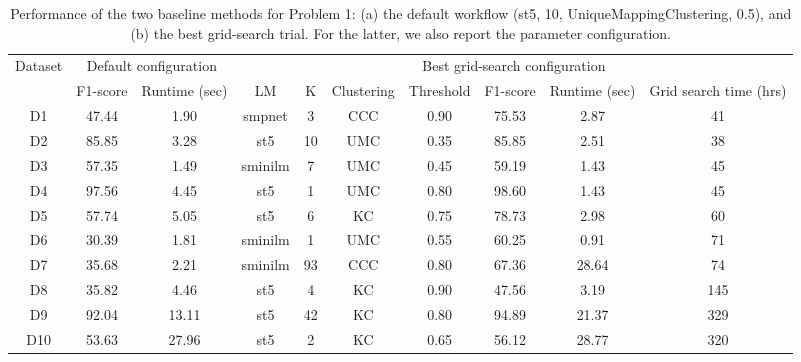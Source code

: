 \begin{table*}[t]
\begin{center}  
\small 
\caption{Performance of the two baseline methods for Problem 1: (a) the default workflow (st5, 10, UniqueMappingClustering, 0.5), and (b) the best grid-search trial. For the latter, we also report the parameter configuration.}
\label{tab:best-gridesearch-trials}
\begin{tabular}{|c||c|c||c|c|c|c||c|c|c|}
\hline
\multirow{2}{*}{Dataset} & \multicolumn{2}{c||}{Default configuration} & \multicolumn{7}{c|}{Best grid-search configuration} \\
& F1-score & Runtime (sec) & LM & K & Clustering & Threshold & F1-score & Runtime (sec) & Grid search time (hrs) \\
\hline
\hline
D1 & 47.44 & 1.90 & smpnet & 3 & CCC & 0.90 & 75.53 & 2.87 & 41 \\
D2 & 85.85 & 3.28 & st5 & 10 & UMC & 0.35 & 85.85 & 2.51 & 38 \\
D3 & 57.35 & 1.49 & sminilm & 7 & UMC & 0.45 & 59.19 & 1.43 & 45 \\
D4 & 97.56 & 4.45 & st5 & 1 & UMC & 0.80 & 98.60 & 1.43 & 45 \\
D5 & 57.74 & 5.05 & st5 & 6 & KC & 0.75 & 78.73 & 2.98 & 60 \\
D6 & 30.39 & 1.81 & sminilm & 1 & UMC & 0.55 & 60.25 & 0.91 & 71 \\
D7 & 35.68 & 2.21 & sminilm & 93 & CCC & 0.80 & 67.36 & 28.64 & 74 \\
D8 & 35.82 & 4.46 & st5 & 4 & KC & 0.90 & 47.56 & 3.19 & 145 \\
D9 & 92.04 & 13.11 & st5 & 42 & KC & 0.80 & 94.89 & 21.37 & 329 \\
D10 & 53.63 & 27.96 & st5 & 2 & KC & 0.65 & 56.12 & 28.77 & 320 \\
\hline
\end{tabular}
\end{center}  
\end{table*}